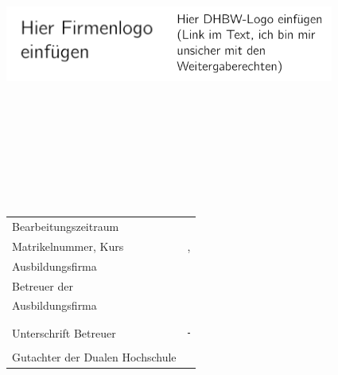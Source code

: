 \begin{titlepage}
\includegraphics[height=2.5cm]{img/logo.png}\hfill\includegraphics[height=2.5cm]{img/dhbw.png}
\begin{center}
    \vspace*{\baselineskip}{\LARGE \textbf{\thetitle}}\\
    \\
    \\
    \\
    \\
    \\
    \vspace*{.25\baselineskip}{\Large \textbf{\theauthor{}}}\\
\end{center}
\vfill
\begin{tabularx}{\textwidth}{Xl}
    Bearbeitungszeitraum & \timespan{} \\
    Matrikelnummer, Kurs & \matriculation{}, \course{} \\
    Ausbildungsfirma & \company{} \\
    Betreuer der & \supervisor{} \\
    Ausbildungsfirma &\\
    &\\
    Unterschrift Betreuer & \rule{7cm}{1pt} \\
    Gutachter der Dualen Hochschule & \evaluator{}
\end{tabularx}
\end{titlepage}
